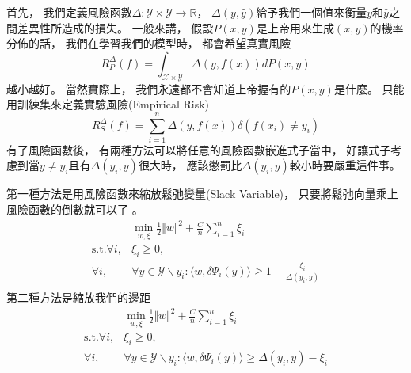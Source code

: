   首先，
  我們定義風險函數$\Delta: \mathcal{Y} \times \mathcal{Y} \longrightarrow \mathbb{R}$，
  $\Delta(y, \hat{y})$給予我們一個值來衡量$y$和$\hat{y}$之間差異性所造成的損失。
  一般來講，
  假設$P(x, y)$是上帝用來生成$(x, y)$的機率分佈的話，
  我們在學習我們的模型時，
  都會希望真實風險
  \begin{equation}
    R^{\Delta}_{P}(f) = \int_{\mathcal{X} \times \mathcal{Y}} \Delta(y, f(x)) dP(x,y)
  \end{equation}
  越小越好。
  當然實際上，
  我們永遠都不會知道上帝握有的$P(x,y)$是什麼。
  只能用訓練集來定義實驗風險(Empirical Risk)
  \begin{equation}
    R^{\Delta}_{S}(f) = \sum_{i=1}^n \Delta(y, f(x)) \delta(f(x_i) \neq y_i)
  \end{equation}
  有了風險函數後，
  有兩種方法可以將任意的風險函數嵌進式子當中，
  好讓式子考慮到當$y \neq y_i$且有$\Delta(y_i, y)$很大時，
  應該懲罰比$\Delta(y_i, y)$較小時要嚴重這件事。

  第一種方法是用風險函數來縮放鬆弛變量(Slack Variable)，
  只要將鬆弛向量乘上風險函數的倒數就可以了 。
  \begin{equation}
    \begin{split}
      &\min_{w, \xi} \frac{1}{2} \Vert w \Vert^2 + \frac{C}{n} \sum_{i=1}^n \xi_i \\
      \text{s.t.} \forall i, &\xi_i \geq 0, \\
      \forall i, & \forall y \in \mathcal{Y} \backslash y_i:
      \langle w, \delta \Psi_i(y) \rangle \geq 1 - \frac{\xi_i}{\Delta(y_i, y)} \\
    \end{split}
  \end{equation}
  第二種方法是縮放我們的邊距
  \begin{equation}
    \begin{split}
      &\min_{w, \xi} \frac{1}{2} \Vert w \Vert^2 + \frac{C}{n} \sum_{i=1}^n \xi_i \\
      \text{s.t.} \forall i, &\xi_i \geq 0, \\
      \forall i, & \forall y \in \mathcal{Y} \backslash y_i:
      \langle w, \delta \Psi_i(y) \rangle \geq \Delta(y_i, y) - \xi_i \\
    \end{split}
  \end{equation}

